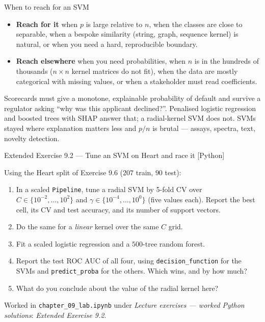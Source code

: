 \documentclass[aspectratio=169,11pt]{beamer}
\begin{document}
\begin{frame}{When to reach for an SVM}
  \begin{readme}
    \begin{itemize}
      \item \textbf{Reach for it} when $p$ is large relative to $n$, when the
            classes are close to separable, when a bespoke similarity (string,
            graph, sequence kernel) is natural, or when you need a hard,
            reproducible boundary.
      \item \textbf{Reach elsewhere} when you need probabilities, when $n$ is
            in the hundreds of thousands ($n\times n$ kernel matrices do not
            fit), when the data are mostly categorical with missing values, or
            when a stakeholder must read coefficients.
    \end{itemize}
  \end{readme}
  \begin{industry}
    Scorecards must give a monotone, explainable probability of default and
    survive a regulator asking ``why was this applicant declined?''. Penalised
    logistic regression and boosted trees with SHAP answer that; a
    radial-kernel SVM does not. SVMs stayed where explanation matters less and
    $p/n$ is brutal --- assays, spectra, text, novelty detection.
  \end{industry}
\end{frame}

\begin{frame}{Extended Exercise 9.2 --- Tune an SVM on Heart and race it [Python]}
\begin{longexercise}
  Using the Heart split of Exercise 9.6 ($207$ train, $90$ test):
  \begin{enumerate}
    \item In a scaled \texttt{Pipeline}, tune a radial SVM by 5-fold CV over
          $C\in\{10^{-2},\dots,10^{2}\}$ and
          $\gamma\in\{10^{-4},\dots,10^{0}\}$ (five values each). Report the
          best cell, its CV and test accuracy, and its number of support
          vectors.
    \item Do the same for a \emph{linear} kernel over the same $C$ grid.
    \item Fit a scaled logistic regression and a $500$-tree random forest.
    \item Report the test ROC AUC of all four, using
          \texttt{decision\_function} for the SVMs and
          \texttt{predict\_proba} for the others. Which wins, and by how much?
    \item What do you conclude about the value of the radial kernel here?
  \end{enumerate}
\end{longexercise}
\begin{labnote}
  Worked in \texttt{chapter\_09\_lab.ipynb} under \emph{Lecture exercises ---
  worked Python solutions}: \emph{Extended Exercise 9.2}.
\end{labnote}
\end{frame}
\end{document}
